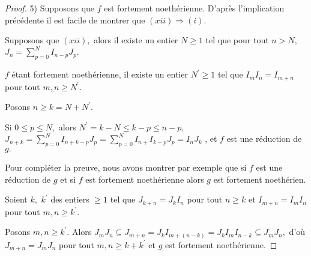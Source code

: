 \documentclass[12pt, a4paper, oneside]{book}
\begin{document}
\begin{proof}
	5) Supposons que $f$ est fortement noethérienne. D'après
	l'implication précédente il est facile de montrer que $(xii)\Longrightarrow (i).$
	
	Supposons que $(xii),$ alors il existe un entier $N\geq 1$ tel que pour tout $n>N,$ $J_{n}=\sum\limits_{p=0}^{N}I_{n-p}J_{p}.$
	
	$f$ étant fortement noethérienne, il existe un entier $N^{\prime}\geq 1$ tel que $I_{m}I_{n}=I_{m+n}$ pour tout $m,n\geq N^{\prime }.$
	
	Posons $n\geq k=N+N^{\prime }.$
	
	Si $0\leq p\leq N,$ alors $N^{\prime }=k-N\leq k-p\leq n-p,$ $J_{n+k}=\sum\limits_{p=0}^{N}I_{n+k-p}J_{p}=\sum\limits_{p=0}^{N}I_{n+}I_{k-p}J_{p}=I_{n}J_{k}$ , et $f$ est une réduction de $g.$
	
	Pour compléter la preuve, nous avons montrer par exemple que si $f$ est une réduction de $g$ et si $f$ est fortement noethérienne alors $g$ est fortement noethérien.
	
	Soient $k,$ $k^{\prime }$ des entiers $\geq 1$ tel que $J_{k+n}=J_{k}I_{n}$
	pour tout $n\geq k$ et $I_{m+n}=I_{m}I_{n}$ pour tout $m,n\geq k^{\prime }.$
	
	Posons $m,n\geq k^{\prime }.$ Alors $J_{m}J_{n}\subseteq
	J_{m+n}=J_{k}I_{m+(n-k)}=J_{k}I_{m}I_{n-k}\subseteq J_{m}J_{n},$ d'où $J_{m+n}=J_{m}J_{n}$ pour tout $m,n\geq k+k^{\prime }$ et $g$ est fortement noethérienne.
\end{proof}
\end{document}
